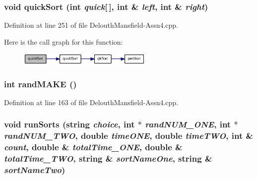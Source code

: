 \hypertarget{_delouth_mansfield-_assn4_8cpp_a9737d54cba3a8ffec81c622892328116}{
\subsubsection[{quickSort}]{\setlength{\rightskip}{0pt plus 5cm}void quickSort (int {\em quick}\mbox{[}$\,$\mbox{]}, \/  int \& {\em left}, \/  int \& {\em right})}}
\label{_delouth_mansfield-_assn4_8cpp_a9737d54cba3a8ffec81c622892328116}


Definition at line 251 of file DelouthMansfield-\/Assn4.cpp.



Here is the call graph for this function:\nopagebreak
\begin{figure}[H]
\begin{center}
\leavevmode
\includegraphics[width=183pt]{_delouth_mansfield-_assn4_8cpp_a9737d54cba3a8ffec81c622892328116_cgraph}
\end{center}
\end{figure}


\hypertarget{_delouth_mansfield-_assn4_8cpp_a191743d28b671610e8d78df14b41ed9e}{
\subsubsection[{randMAKE}]{\setlength{\rightskip}{0pt plus 5cm}int randMAKE ()}}
\label{_delouth_mansfield-_assn4_8cpp_a191743d28b671610e8d78df14b41ed9e}


Definition at line 163 of file DelouthMansfield-\/Assn4.cpp.

\hypertarget{_delouth_mansfield-_assn4_8cpp_ab8afa82cf87b47530bd2505812a9fc82}{
\subsubsection[{runSorts}]{\setlength{\rightskip}{0pt plus 5cm}void runSorts (string {\em choice}, \/  int $\ast$ {\em randNUM\_\-ONE}, \/  int $\ast$ {\em randNUM\_\-TWO}, \/  double {\em timeONE}, \/  double {\em timeTWO}, \/  int \& {\em count}, \/  double \& {\em totalTime\_\-ONE}, \/  double \& {\em totalTime\_\-TWO}, \/  string \& {\em sortNameOne}, \/  string \& {\em sortNameTwo})}}
\label{_delouth_mansfield-_assn4_8cpp_ab8afa82cf87b47530bd2505812a9fc82}


